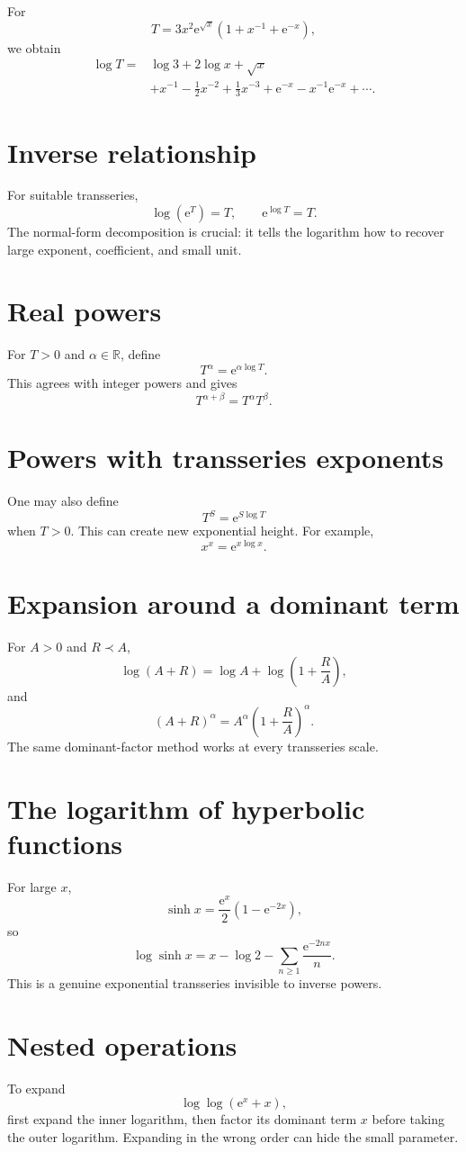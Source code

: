 \documentclass[11pt,oneside,openany]{book}
\newcommand{\R}{\mathbb{R}}
\newcommand{\e}{\mathrm{e}}
\theoremstyle{plain}
\theoremstyle{definition}
\theoremstyle{remark}
\begin{document}
\begin{worked}
For
\[
  T=3x^2\e^{\sqrt{x}}
  \left(1+x^{-1}+\e^{-x}\right),
\]
we obtain
\[
\begin{aligned}
\log T={}&\log3+2\log x+\sqrt{x}\\
&+x^{-1}-\frac12x^{-2}+\frac13x^{-3}
+\e^{-x}-x^{-1}\e^{-x}+\cdots.
\end{aligned}
\]
\end{worked}

\section{Inverse relationship}
For suitable transseries,
\[
  \log(\e^T)=T,
  \qquad
  \e^{\log T}=T.
\]
The normal-form decomposition is crucial: it tells the logarithm how to recover large exponent, coefficient, and small unit.

\section{Real powers}
For $T>0$ and $\alpha\in\R$, define
\[
  T^\alpha=\e^{\alpha\log T}.
\]
This agrees with integer powers and gives
\[
  T^{\alpha+\beta}=T^\alpha T^\beta.
\]

\section{Powers with transseries exponents}
One may also define
\[
  T^S=\e^{S\log T}
\]
when $T>0$. This can create new exponential height. For example,
\[
  x^x=\e^{x\log x}.
\]

\section{Expansion around a dominant term}
For $A>0$ and $R\prec A$,
\[
  \log(A+R)=\log A+
  \log\left(1+\frac RA\right),
\]
and
\[
  (A+R)^\alpha=A^\alpha
  \left(1+\frac RA\right)^\alpha.
\]
The same dominant-factor method works at every transseries scale.

\section{The logarithm of hyperbolic functions}
For large $x$,
\[
  \sinh x=\frac{\e^x}{2}(1-\e^{-2x}),
\]
so
\[
  \log\sinh x=x-\log2-
  \sum_{n\ge1}\frac{\e^{-2nx}}n.
\]
This is a genuine exponential transseries invisible to inverse powers.

\section{Nested operations}
To expand
\[
  \log\log(\e^x+x),
\]
first expand the inner logarithm, then factor its dominant term $x$ before taking the outer logarithm. Expanding in the wrong order can hide the small parameter.
\end{document}
